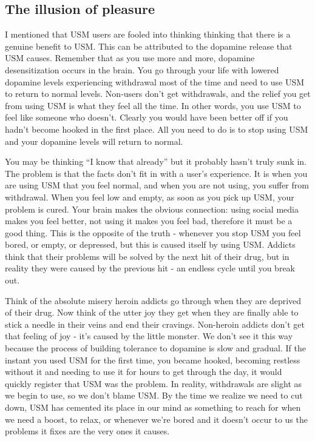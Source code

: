 \documentclass[
  openany]{book}
\begin{document}
\subsection{The illusion of pleasure}\label{the-illusion-of-pleasure}

I mentioned that USM users are fooled into thinking thinking that there is a genuine benefit to USM. This can be attributed to the dopamine release that USM causes. Remember that as you use more and more, dopamine desensitization occurs in the brain. You go through your life with lowered dopamine levels experiencing withdrawal most of the time and need to use USM to return to normal levels. Non-users don't get withdrawals, and the relief you get from using USM is what they feel all the time. In other words, you use USM to feel like someone who doesn't. Clearly you would have been better off if you hadn't become hooked in the first place. All you need to do is to stop using USM and your dopamine levels will return to normal.

You may be thinking ``I know that already'' but it probably hasn't truly sunk in. The problem is that the facts don't fit in with a user's experience. It is when you are using USM that you feel normal, and when you are not using, you suffer from withdrawal. When you feel low and empty, as soon as you pick up USM, your problem is cured. Your brain makes the obvious connection: using social media makes you feel better, not using it makes you feel bad, therefore it must be a good thing. This is the opposite of the truth - whenever you stop USM you feel bored, or empty, or depressed, but this is caused itself by using USM. Addicts think that their problems will be solved by the next hit of their drug, but in reality they were caused by the previous hit - an endless cycle until you break out.

Think of the absolute misery heroin addicts go through when they are deprived of their drug. Now think of the utter joy they get when they are finally able to stick a needle in their veins and end their cravings. Non-heroin addicts don't get that feeling of joy - it's caused by the little monster. We don't see it this way because the process of building tolerance to dopamine is slow and gradual. If the instant you used USM for the first time, you became hooked, becoming restless without it and needing to use it for hours to get through the day, it would quickly register that USM was the problem. In reality, withdrawals are slight as we begin to use, so we don't blame USM. By the time we realize we need to cut down, USM has cemented its place in our mind as something to reach for when we need a boost, to relax, or whenever we're bored and it doesn't occur to us the problems it fixes are the very ones it causes.
\end{document}
